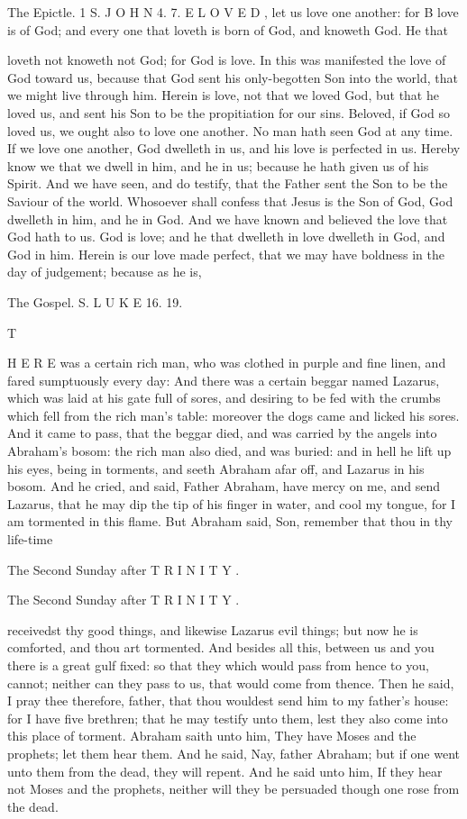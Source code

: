 The Epictle. 1 S. J O H N 4. 7. E L O V E D , let us love one another: for B love is of God; and every one that loveth is born of God, and knoweth God. He that

loveth not knoweth not God; for God is love. In this was manifested the love of God toward us, because that God sent his only-begotten Son into the world, that we might live through him. Herein is love, not that we loved God, but that he loved us, and sent his Son to be the propitiation for our sins. Beloved, if God so loved us, we ought also to love one another. No man hath seen God at any time. If we love one another, God dwelleth in us, and his love is perfected in us. Hereby know we that we dwell in him, and he in us; because he hath given us of his Spirit. And we have seen, and do testify, that the Father sent the Son to be the Saviour of the world. Whosoever shall confess that Jesus is the Son of God, God dwelleth in him, and he in God. And we have known and believed the love that God hath to us. God is love; and he that dwelleth in love dwelleth in God, and God in him. Herein is our love made perfect, that we may have boldness in the day of judgement; because as he is,

The Gospel. S. L U K E 16. 19.

T

H E R E was a certain rich man, who was clothed in purple and fine linen, and fared sumptuously every day: And there was a certain beggar named Lazarus, which was laid at his gate full of sores, and desiring to be fed with the crumbs which fell from the rich man’s table: moreover the dogs came and licked his sores. And it came to pass, that the beggar died, and was carried by the angels into Abraham’s bosom: the rich man also died, and was buried: and in hell he lift up his eyes, being in torments, and seeth Abraham afar off, and Lazarus in his bosom. And he cried, and said, Father Abraham, have mercy on me, and send Lazarus, that he may dip the tip of his finger in water, and cool my tongue, for I am tormented in this flame. But Abraham said, Son, remember that thou in thy life-time

The Second Sunday after T R I N I T Y .

The Second Sunday after T R I N I T Y .

receivedst thy good things, and likewise Lazarus evil things; but now he is comforted, and thou art tormented. And besides all this, between us and you there is a great gulf fixed: so that they which would pass from hence to you, cannot; neither can they pass to us, that would come from thence. Then he said, I pray thee therefore, father, that thou wouldest send him to my father’s house: for I have five brethren; that he may testify unto them, lest they also come into this place of torment. Abraham saith unto him, They have Moses and the prophets; let them hear them. And he said, Nay, father Abraham; but if one went unto them from the dead, they will repent. And he said unto him, If they hear not Moses and the prophets, neither will they be persuaded though one rose from the dead.

